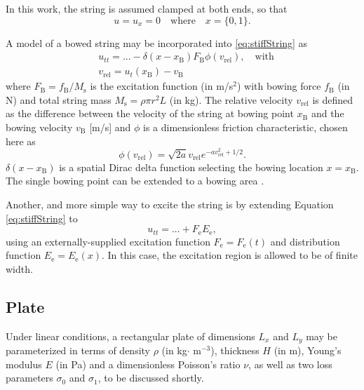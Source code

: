 \documentclass{article}
\begin{document}
In this work, the string is assumed clamped at both ends, so that
\begin{equation}\label{boundary}
    u = u_x = 0 \quad \text{where} \quad x = \{0, 1\}.
\end{equation}

A model of a bowed string \cite{Bilbao2009:NumericalSoundSynthesis} may be incorporated into \eqref{eq:stiffString} as  
\begin{align}
    \label{eq:bowedString} &u_{tt} = ... - \delta(x-x_\text{B})F_\text{B}\phi(v_\text{rel}), \quad \text{with} \\
    &v_\text{rel} = u_t(x_\text{B}) - v_\text{B}
\end{align}
where $F_\text{B} = f_\text{B}/ M_\text{s}$ is the excitation function (in m/s$^2$) with bowing force $f_\text{B}$ (in N) and total string mass $M_\text{s} = \rho\pi r^2 L$ (in kg). The relative velocity $v_\text{rel}$ is defined as the difference between the velocity of the string at bowing point $x_\text{B}$ and the bowing velocity $v_\text{B}$ [m/s] and $\phi$ is a dimensionless friction characteristic, chosen here as \cite{Bilbao2009:NumericalSoundSynthesis}
\begin{equation}
    \phi(v_\text{rel}) = \sqrt{2a}v_\text{rel} e^{-av_\text{rel}^2+1/2}.
\end{equation}
$\delta(x-x_\text{B})$ is a spatial Dirac delta function selecting the bowing location $x=x_\text{B}$. The single bowing point can be extended to a bowing area \cite{Bilbao2009:NumericalSoundSynthesis}.

Another, and more simple way to excite the string is by extending Equation \eqref{eq:stiffString} to
\begin{equation}
    \label{eq:excitedString} u_{tt} = ... + F_\text{e}E_\text{e},
\end{equation}
using an externally-supplied excitation function $F_\text{e} = F_\text{e}(t)$ and distribution function $E_\text{e} = E_\text{e}(x)$. In this case, the excitation region is allowed to be of finite width.
\subsection{Plate}\label{subsec:platePDE}
Under linear conditions, a rectangular plate of dimensions $L_{x}$ and $L_{y}$ may be parameterized in terms of density $\rho$ (in kg$\cdot$ m$^{-3}$), thickness $H$ (in m), Young's modulus $E$ (in Pa) and a dimensionless Poisson's ratio $\nu$, as well as two loss parameters $\sigma_{0}$ and $\sigma_{1}$, to be discussed shortly.  
\end{document}
